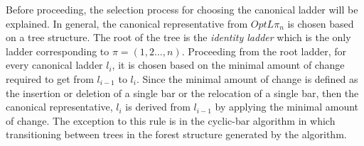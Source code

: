 Before proceeding, the selection process for choosing the canonical ladder will be explained.
In general, the canonical representative from $OptL{\pi_{n}}$ is chosen based on a tree structure. 
The root of the tree is the \emph{identity ladder} which is the only ladder 
corresponding to $\pi=(1,2 \dots ,n)$.
Proceeding from the root ladder, for every canonical ladder $l_{i}$, it 
is chosen based on the minimal amount of change required to get from $l_{i-1}$ to $l_{i}$. 
Since the minimal amount of change is defined as the insertion or deletion of a single bar 
or the relocation of a single bar, then the canonical representative, $l_{i}$ 
is derived from $l_{i-1}$ by applying the minimal amount of change. The exception to this rule is 
in the cyclic-bar algorithm in which transitioning between trees in the forest 
structure generated by the algorithm.


